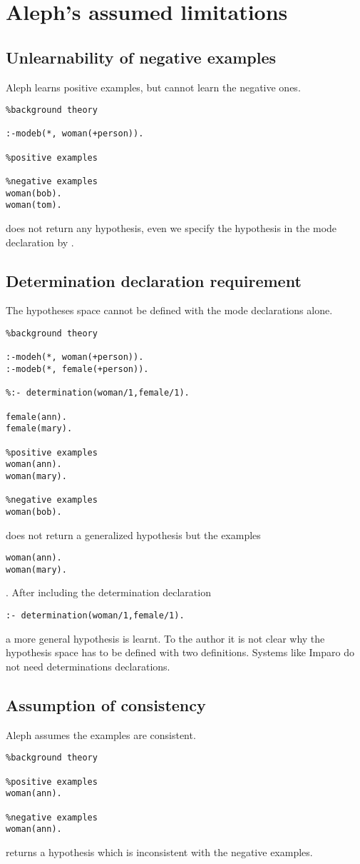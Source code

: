 \section{Aleph's assumed limitations}
\subsection{Unlearnability of negative examples}
Aleph learns positive examples, but cannot learn the negative ones.
\begin{lstlisting}
%background theory

:-modeb(*, woman(+person)).

%positive examples

%negative examples
woman(bob).
woman(tom).
\end{lstlisting}
does not return any hypothesis, even we specify the hypothesis in the mode declaration by .

\subsection{Determination declaration requirement}
The hypotheses space cannot be defined with the mode declarations alone.
\begin{lstlisting}
%background theory

:-modeh(*, woman(+person)).
:-modeb(*, female(+person)).

%:- determination(woman/1,female/1).

female(ann).
female(mary).

%positive examples
woman(ann).
woman(mary).

%negative examples
woman(bob).
\end{lstlisting}

does not return a generalized hypothesis but the examples
\begin{lstlisting}
woman(ann).
woman(mary).
\end{lstlisting}.
After including the determination declaration
\begin{lstlisting}
:- determination(woman/1,female/1).
\end{lstlisting}
a more general hypothesis  is learnt. To the author it is not clear why the hypothesis space has to be defined with two definitions. Systems like Imparo do not need determinations declarations.

\subsection{Assumption of consistency}
Aleph assumes the examples are consistent.
\begin{lstlisting}
%background theory

%positive examples
woman(ann).

%negative examples
woman(ann).
\end{lstlisting}
returns a hypothesis  which is inconsistent with the negative examples.

